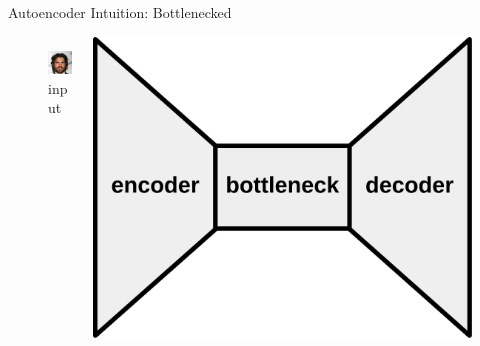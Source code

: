\begin{frame}{Autoencoder Intuition: Bottlenecked}

\begin{figure}

  \centering

  \begin{columns}
  \begin{column}{0.25\textwidth}
  \Large
  \centering
  \phantom{input}
  \includegraphics[width=\textwidth]{img/guy}\\
  input
  \end{column}
  \begin{column}{0.5\textwidth}
  \includegraphics[width=\textwidth]{img/stripped_bottleneck}

\end{column}
\end{columns}
\end{figure}
\end{frame}
